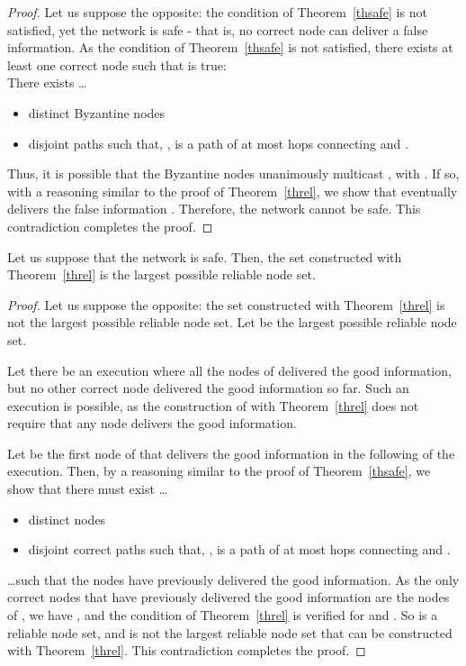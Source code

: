 \documentclass[a4paper,11pt]{article}
\begin{document}
\begin{proof}
Let us suppose the opposite: the condition of Theorem~\ref{thsafe} is not satisfied, yet the network is safe - that is, no correct node can deliver a false information.
As the condition of Theorem~\ref{thsafe} is not satisfied, there exists at least one correct node  such that  is true:
\\There exists \dots
\begin{itemize}
\item  distinct Byzantine nodes 
\item  disjoint paths  such that, ,  is a path of at most  hops connecting  and .
\end{itemize}

Thus, it is possible that the Byzantine nodes  unanimously multicast , with . If so, with a reasoning similar to the proof of Theorem~\ref{threl}, we show that  eventually delivers the false information . Therefore, the network cannot be safe. This contradiction completes the proof.

\end{proof}

\begin{theorem}
Let us suppose that the network is safe. Then, the set constructed with Theorem~\ref{threl} is the largest possible reliable node set.
\end{theorem}

\begin{proof}
Let us suppose the opposite: the set  constructed with Theorem~\ref{threl} is not the largest possible reliable node set. Let  be the largest possible reliable node set.

Let there be an execution where all the nodes of  delivered the good information, but no other correct node delivered the good information so far.
Such an execution is possible, as the construction of  with Theorem~\ref{threl} does not require that any node  delivers the good information.

Let  be the first node of  that delivers the good information in the following of the execution.
Then, by a reasoning similar to the proof of Theorem~\ref{thsafe}, we show that there must exist \dots 

\begin{itemize}
\item  distinct nodes 
\item  disjoint correct paths  such that, ,  is a path of at most  hops connecting  and .
\end{itemize}

\dots such that the nodes  have previously delivered the good information.
As the only correct nodes that have previously delivered the good information are the nodes of , we have , and the condition of Theorem~\ref{threl} is verified for  and . So  is a reliable node set, and  is not the largest reliable node set that can be constructed with Theorem~\ref{threl}. This contradiction completes the proof.
\end{proof}
\end{document}
